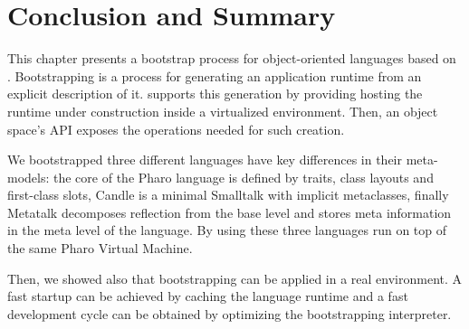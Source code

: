 \section{Conclusion and Summary}

This chapter presents a bootstrap process for object-oriented languages based on \Vtt. Bootstrapping is a process for generating an application runtime from an explicit description of it. \Vtt supports this generation by providing hosting the runtime under construction inside a virtualized environment. Then, an object space's API exposes the operations needed for such creation.


We bootstrapped three different languages have key differences in their meta-models: the core of the Pharo language is defined by traits, class layouts and first-class slots, Candle is a minimal Smalltalk with implicit metaclasses, finally Metatalk decomposes reflection from the base level and stores meta information in the meta level of the language. By using \Vtt these three languages run on top of the same Pharo Virtual Machine.

Then, we showed also that bootstrapping can be applied in a real environment. A fast startup can be achieved by caching the language runtime and a fast development cycle can be obtained by optimizing the bootstrapping interpreter.
